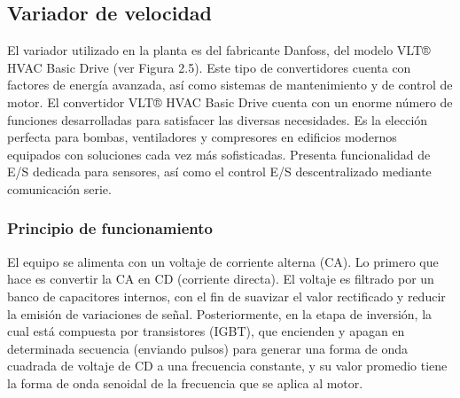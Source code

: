 \subsection{Variador de velocidad}

El variador utilizado en la planta es del fabricante Danfoss, del modelo
VLT® HVAC Basic Drive (ver Figura 2.5). Este tipo de convertidores cuenta con
factores de energía avanzada, así como sistemas de mantenimiento y de control
de motor. El convertidor VLT® HVAC Basic Drive cuenta con un enorme número
de funciones desarrolladas para satisfacer las diversas necesidades. Es la
elección perfecta para bombas, ventiladores y compresores en edificios modernos equipados con soluciones cada vez más sofisticadas. Presenta
funcionalidad de E/S dedicada para sensores, así como el control E/S
descentralizado mediante comunicación serie. \\ 

\subsubsection*{Principio de funcionamiento}

El equipo se alimenta con un voltaje de corriente alterna (CA). Lo primero
que hace es convertir la CA en CD (corriente directa). El voltaje es filtrado por un
banco de capacitores internos, con el fin de suavizar el valor rectificado y reducir
la emisión de variaciones de señal. Posteriormente, en la etapa de inversión, la
cual está compuesta por transistores (IGBT), que encienden y apagan en
determinada secuencia (enviando pulsos) para generar una forma de onda
cuadrada de voltaje de CD a una frecuencia constante, y su valor promedio tiene
la forma de onda senoidal de la frecuencia que se aplica al motor.\\



